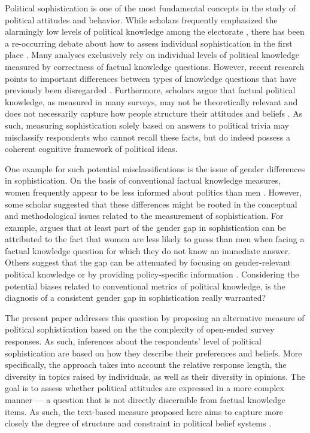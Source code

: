 \documentclass[12pt]{article}
\begin{document}
Political sophistication is one of the most fundamental concepts in the study of political attitudes and behavior. While scholars frequently emphasized the alarmingly low levels of political knowledge among the electorate \citep{converse1964nature,carpini1996americans}, there has been a re-occurring debate about how to assess individual sophistication in the first place \citep[e.g.][]{mondak2000reconsidering,mondak2001asked,sturgis2008experiment,debell2013harder,pietryka2013analysis}. Many analyses exclusively rely on individual levels of political knowledge measured by correctness of factual knowledge questions. However, recent research points to important differences between types of knowledge questions that have previously been disregarded \citep{barabas2014question}. Furthermore, scholars argue that factual political knowledge, as measured in many surveys, may not be theoretically relevant \citep{lupia2006elitism} and does not necessarily capture how people structure their attitudes and beliefs \citep[e.g.][]{luskin1987measuring}. As such, measuring sophistication solely based on answers to political trivia may misclassify respondents who cannot recall these facts, but do indeed possess a coherent cognitive framework of political ideas.

One example for such potential misclassifications is the issue of gender differences in sophistication. On the basis of conventional factual knowledge measures, women frequently appear to be less informed about politics than men \citep{verba1997knowing,wolak2011roots}. However, some scholar suggested that these differences might be rooted in the conceptual and methodological issues related to the measurement of sophistication. For example, \citet{mondak2004knowledge} argues that at least part of the gender gap in sophistication can be attributed to the fact that women are less likely to guess than men when facing a factual knowledge question for which they do not know an immediate answer. Others suggest that the gap can be attenuated by focusing on gender-relevant political knowledge \citep[e.g.,][]{dolan2011women} or by providing policy-specific information \citep[e.g.,][]{jerit2017revisiting}. Considering the potential biases related to conventional metrics of political knowledge, is the diagnosis of a consistent gender gap in sophistication really warranted?

The present paper addresses this question by proposing an alternative measure of political sophistication based on the the complexity of open-ended survey responses. As such, inferences about the respondents' level of political sophistication are based on how they describe their preferences and beliefs. More specifically, the approach takes into account the relative response length, the diversity in topics raised by individuals, as well as their diversity in opinions. The goal is to assess whether political attitudes are expressed in a more complex manner --- a question that is not directly discernible from factual knowledge items. As such, the text-based measure proposed here aims to capture more closely the degree of structure and constraint in political belief systems
\citep[see for example][]{tetlock1983cognitive,luskin1987measuring}. 
\end{document}
